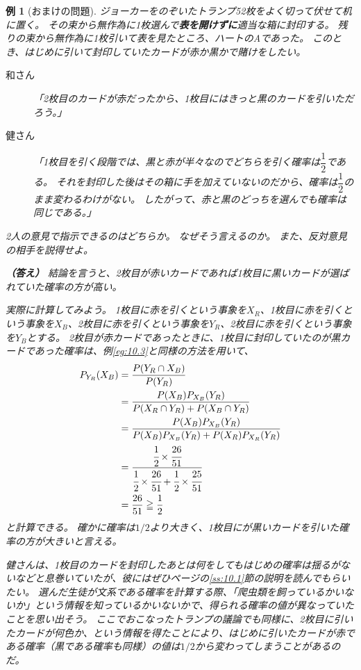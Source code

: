 \documentclass[luatexja,fontsize=12pt]{jlreq}\usepackage{ifthen}\newcounter{enlarge}\setcounter{enlarge}{1}
\newtheorem{eg}{例}
\begin{document}
\begin{eg}[おまけの問題]
ジョーカーをのぞいたトランプ52枚をよく切って伏せて机に置く。
その束から無作為に1枚選んで\textbf{表を開けずに}適当な箱に封印する。
残りの束から無作為に1枚引いて表を見たところ、ハートのAであった。
このとき、はじめに引いて封印していたカードが赤か黒かで賭けをしたい。
\begin{description}
\item[和さん]  「2枚目のカードが赤だったから、1枚目にはきっと黒のカードを引いただろう。」
\item[健さん]  「1枚目を引く段階では、黒と赤が半々なのでどちらを引く確率は$\dfrac{1}{2}$である。
それを封印した後はその箱に手を加えていないのだから、確率は$\dfrac{1}{2}$のまま変わるわけがない。
したがって、赤と黒のどっちを選んでも確率は同じである。」
\end{description}

2人の意見で指示できるのはどちらか。
なぜそう言えるのか。
また、反対意見の相手を説得せよ。

\textbf{（答え）}
結論を言うと、2枚目が赤いカードであれば1枚目に黒いカードが選ばれていた確率の方が高い。

実際に計算してみよう。
1枚目に赤を引くという事象を$X_R$、1枚目に赤を引くという事象を$X_B$、2枚目に赤を引くという事象を$Y_R$、2枚目に赤を引くという事象を$Y_B$とする。
2枚目が赤カードであったときに、1枚目に封印していたのが黒カードであった確率は、例\ref{eg:10.3}と同様の方法を用いて、
\begin{align}
P_{Y_R } (X_B ) &= \frac{P(Y_R \cap X_B )}{P(Y_R )} \notag \\
&= \frac{P(X_B ) P_{X_B} (Y_R )}{P(X_R \cap Y_R) + P(X_B \cap Y_R) } \notag \\
&= \frac{P(X_B ) P_{X_B} (Y_R )}{P(X_B ) P_{X_B} (Y_R ) + P(X_R ) P_{X_R} (Y_R ) } \notag \\
&= \cfrac{\cfrac{1}{2} \times \cfrac{26}{51} }{\cfrac{1}{2} \times \cfrac{26}{51} + \cfrac{1}{2} \times \cfrac{25}{51} } \notag \\
&= \frac{26}{51} \geqq \frac{1}{2} 
\end{align}
と計算できる。
確かに確率は$1/2$より大きく、1枚目にが黒いカードを引いた確率の方が大きいと言える。

健さんは、1枚目のカードを封印したあとは何をしてもはじめの確率は揺るがないなどと息巻いていたが、彼にはぜひ\pageref{ss:10.1}ページの\ref{ss:10.1}節の説明を読んでもらいたい。
選んだ生徒が文系である確率を計算する際、「爬虫類を飼っているかいないか」という情報を知っているかいないかで、得られる確率の値が異なっていたことを思い出そう。
ここでおこなったトランプの議論でも同様に、2枚目に引いたカードが何色か、という情報を得たことにより、はじめに引いたカードが赤である確率（黒である確率も同様）の値は$1/2$から変わってしまうことがあるのだ。
\end{eg}
\end{document}
